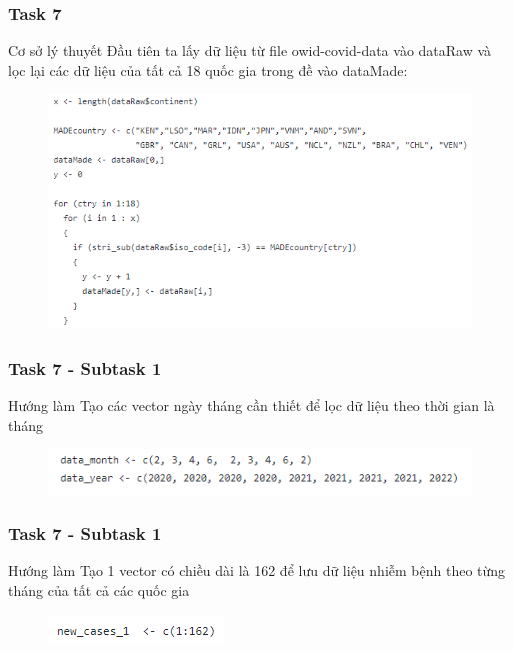 \documentclass[english,10pt,table]{beamer}
\begin{document}
\frame
{
    \frametitle{Task 7}
    \begin{block}{Cơ sở lý thuyết}
    Đầu tiên ta lấy dữ liệu từ file owid-covid-data vào dataRaw và lọc lại các dữ liệu của tất cả 18 quốc gia trong đề vào dataMade:
    \begin{figure}[H]
		\centering
		\includegraphics[scale=0.6]{images/7.0.png}
	\end{figure}
    \end{block}
}
\frame
{
    \frametitle{Task 7 - Subtask 1}
    \begin{block}{Hướng làm}
    Tạo các vector ngày tháng cần thiết để lọc dữ liệu theo thời gian là tháng
	\begin{figure}[H]
		\centering
		\includegraphics[scale=0.6]{images/7.0.1.png}
	\end{figure}
    \end{block}
}
\frame
{
    \frametitle{Task 7 - Subtask 1}
    \begin{block}{Hướng làm}
    Tạo 1 vector có chiều dài là 162 để lưu dữ liệu nhiễm bệnh theo từng tháng của tất cả các quốc gia
	\begin{figure}[H]
		\centering
		\includegraphics[scale=0.6]{images/7.0.2.png}
	\end{figure}
    \end{block}
}
\frame
\end{document}
